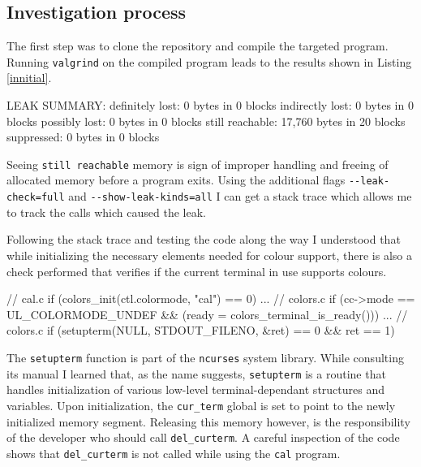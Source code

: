 \documentclass[a4paper,10pt,twocolumn,english]{article}
\begin{document}
\subsection{Investigation process}

The first step was to clone the repository and compile the targeted program.
Running \lstinline{valgrind} on the compiled program leads to the results shown
in Listing \ref{innitial}.

\begin{code}[basicstyle=\ttfamily\small,
    caption=Innitial Leak Summary, label=innitial]
LEAK SUMMARY:
   definitely lost: 0 bytes in 0 blocks
   indirectly lost: 0 bytes in 0 blocks
     possibly lost: 0 bytes in 0 blocks
   still reachable: 17,760 bytes in 20 blocks
        suppressed: 0 bytes in 0 blocks
\end{code}

Seeing \lstinline{still reachable} memory is sign of improper handling and
freeing of allocated memory before a program exits. Using the additional flags
\lstinline{--leak-check=full} and \lstinline{--show-leak-kinds=all} I can get a
stack trace which allows me to track the calls which caused the leak.

Following the stack trace and testing the code along the way I understood that
while initializing the necessary elements needed for colour support, there is
also a check performed that verifies if the current terminal in use supports
colours.

\begin{code}[language=c, basicstyle=\ttfamily\small,
    caption=Stack Trace]
// cal.c
if (colors_init(ctl.colormode, "cal") == 0)
    ...
// colors.c
if (cc->mode == UL_COLORMODE_UNDEF
    && (ready = colors_terminal_is_ready()))
    ...
// colors.c
if (setupterm(NULL, STDOUT_FILENO, &ret) == 0
        && ret == 1)
\end{code}

The \lstinline{setupterm} function is part of the \lstinline{ncurses} system
library. While consulting its manual \cite{ncursesmanual} I learned that, as
the name suggests, \lstinline{setupterm} is a routine that handles
initialization of various low-level terminal-dependant structures and
variables. Upon initialization, the \lstinline{cur_term} global is set to point
to the newly initialized memory segment. Releasing this memory however, is the
responsibility of the developer who should call \lstinline{del_curterm}. A
careful inspection of the code shows that \lstinline{del_curterm} is not called
while using the \lstinline{cal} program.
\end{document}
